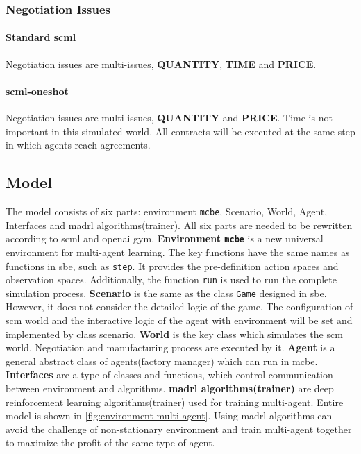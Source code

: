 \subsubsection{Negotiation Issues}
\paragraph{Standard \gls{scml}} Negotiation issues are multi-issues, \textbf{QUANTITY}, \textbf{TIME} and \textbf{PRICE}. 
\paragraph{\gls{scml-oneshot}} Negotiation issues are multi-issues, \textbf{QUANTITY} and \textbf{PRICE}. Time is not important in this simulated world. All contracts will be executed at the same step in which agents reach agreements.

\subsection{Model}
The model consists of six parts: environment \texttt{\gls{mcbe}}, Scenario, World, Agent, Interfaces and \gls{madrl} algorithms(trainer).
All six parts are needed to be rewritten according to \gls{scml} and \gls{openai gym}. 
\textbf{Environment \texttt{\gls{mcbe}}} is a new universal environment for multi-agent learning. The key functions have the same names as functions in \gls{sbe}, such as \texttt{step}. It provides the pre-definition action spaces and observation spaces.  Additionally, the function \texttt{run} is used to run the complete simulation process. 
\textbf{Scenario} is the same as the class \texttt{Game} designed in \gls{sbe}. However, it does not consider the detailed logic of the game. The configuration of \gls{scm} world and the interactive logic of the agent with environment will be set and implemented by class scenario.
\textbf{World} is the key class which simulates the \gls{scm} world. Negotiation and manufacturing process are executed by it.
\textbf{Agent} is a general abstract class of agents(factory manager) which can run in \gls{mcbe}. 
\textbf{Interfaces} are a type of classes and functions, which control communication between environment and algorithms.
\textbf{\gls{madrl} algorithms(trainer)} are deep reinforcement learning algorithms(trainer) used for training multi-agent.
Entire model is shown in \ref{fig:environment-multi-agent}. Using \gls{madrl} algorithms can avoid the challenge of non-stationary environment and train multi-agent together to maximize the profit of the same type of agent.

